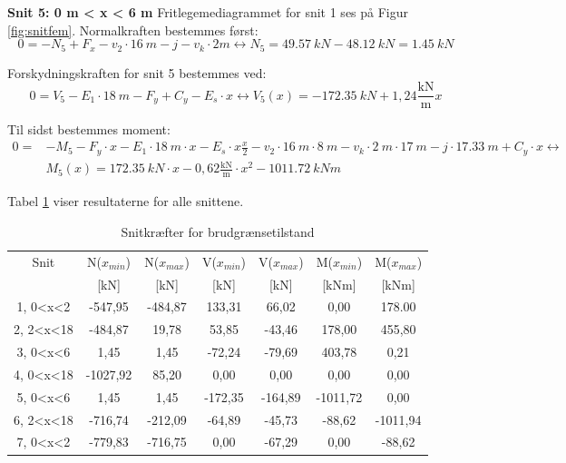 \textbf{Snit 5: 0 m < x < 6 m}
\newline
Fritlegemediagrammet for snit 1 ses på Figur \ref{fig:snitfem}.
\newline
\newline
Normalkraften bestemmes først:
\begin{equation}
	0 = - N_5 + F_x - v_2 \cdot \SI{16}{m} - j - v_k \cdot 2m \leftrightarrow N_5 = \SI{49,57}{kN} - \SI{48,12}{kN} = \SI{1,45}{kN}
\end{equation}

Forskydningskraften for snit 5 bestemmes ved:
\begin{equation}
	0 = V_5 - E_1 \cdot \SI{18}{m} - F_y + C_y - E_s \cdot x \leftrightarrow V_5(x) = \SI{-172,35}{kN} + 1,\!24 \frac{\text{kN}}{\text{m}}x
\end{equation}

Til sidst bestemmes moment:
\begin{equation}
\begin{split}
	0 = & - M_5 - F_y \cdot x - E_1 \cdot \SI{18}{m} \cdot x - E_s \cdot x \frac{x}{2} - v_2 \cdot \SI{16}{m} \cdot \SI{8}{m} - v_k \cdot \SI{2}{m} \cdot \SI{17}{m} - j \cdot \SI{17,33}{m} + C_y \cdot x \leftrightarrow \\ & M_5(x) =  \SI{172,35}{kN} \cdot x - 0,\!62 \frac{\text{kN}}{\text{m}} \cdot x^2 - \SI{1011,72}{kNm}
\end{split}
\end{equation}

Tabel \ref{tab:resultaterbrud} viser resultaterne for alle snittene. 

\begin{table}
	\begin{center}
		\begin{tabular}{c c c c c c c}
			\hline
			Snit & N($x_{min}$) & N($x_{max}$) & V($x_{min}$) & V($x_{max}$) & M($x_{min}$) & M($x_{max}$) 	\\ 
			& [kN] & [kN] & [kN] & [kN] & [kNm] & [kNm] \\ \hline
			1, 0<x<2  & -547,95       & -484,87    	&  133,31    	&  66,02 	&  0,00     &  178.00        		\\ 
			2, 2<x<18 &  -484,87        &  19,78       &  53,85      & -43,46   &  178,00  &  455,80    \\ 
			3, 0<x<6  & 1,45       &  1,45     &  -72,24         &  -79,69     &  403,78     &  0,21 			    \\
			4, 0<x<18 &  -1027,92       &  85,20      &  0,00        &  0,00    &  0,00   &   0,00    \\ 
			5, 0<x<6  &  1,45     &    1,45      &  -172,35      &  -164,89     &   -1011,72        &   0,00      		\\ 
			6, 2<x<18 &  -716,74  &   -212,09  &   -64,89    &   -45,73    &    -88,62       &   -1011,94      		\\ 
			7, 0<x<2 &  -779,83        &   -716,75       &     0,00      &   -67,29   &    0,00     &    -88,62     		\\ 
		\end{tabular}
		\caption{Snitkræfter for brudgrænsetilstand}
		\label{tab:resultaterbrud}
	\end{center}
\end{table}

